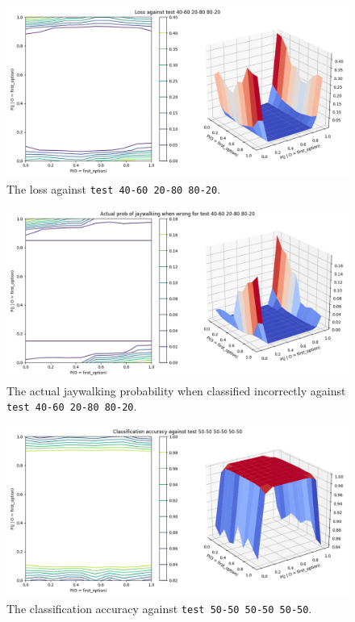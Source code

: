 \documentclass{report}
\newcommand{\code}{\texttt}
\begin{document}
\begin{figure}[h]
    \centering
    \includegraphics[width=\textwidth]{test_40-60_20-80_80-20_loss.png}
    \caption[]{The loss against \code{test 40-60 20-80 80-20}.}
    \label{fig:test_40-60_20-80_80-20_loss_plot}
\end{figure}

\begin{figure}[h]
    \centering
    \includegraphics[width=\textwidth]{test_40-60_20-80_80-20_jay_prob.png}
    \caption[]{The actual jaywalking probability when classified incorrectly against \code{test 40-60 20-80 80-20}.}
    \label{fig:test_40-60_20-80_80-20_jay_prob_plot}
\end{figure}

% 
% 

\begin{figure}[h]
    \centering
    \includegraphics[width=\textwidth]{test_50-50_50-50_50-50_accuracy.png}
    \caption[]{The classification accuracy against \code{test 50-50 50-50 50-50}.}
    \label{fig:test_50-50_50-50_50-50_accuracy_plot}
\end{figure}
\end{document}
